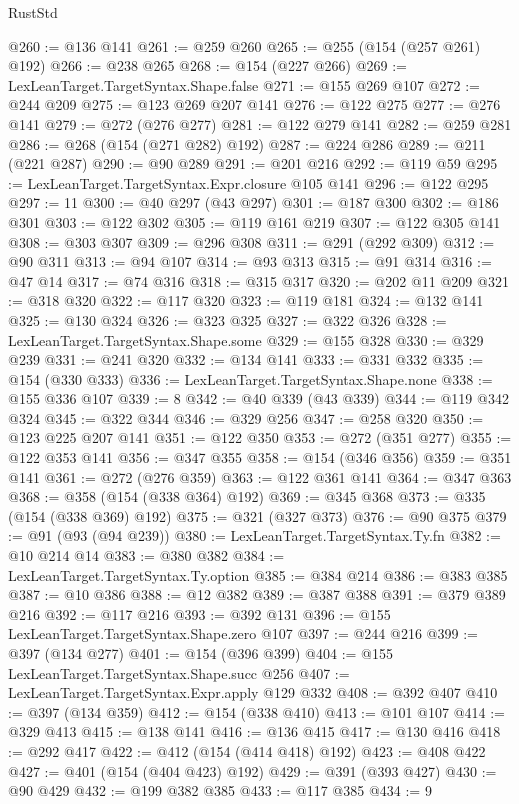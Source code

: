 \begin{lexlean}{RustStd}
\begin{coremodule}
@260 := @136 @141
@261 := @259 @260
@265 := @255 (@154 (@257 @261) @192)
@266 := @238 @265
@268 := @154 (@227 @266)
@269 := LexLeanTarget.TargetSyntax.Shape.false
@271 := @155 @269 @107
@272 := @244 @209
@275 := @123 @269 @207 @141
@276 := @122 @275
@277 := @276 @141
@279 := @272 (@276 @277)
@281 := @122 @279 @141
@282 := @259 @281
@286 := @268 (@154 (@271 @282) @192)
@287 := @224 @286
@289 := @211 (@221 @287)
@290 := @90 @289
@291 := @201 @216
@292 := @119 @59
@295 := LexLeanTarget.TargetSyntax.Expr.closure @105 @141
@296 := @122 @295
@297 := 11
@300 := @40 @297 (@43 @297)
@301 := @187 @300
@302 := @186 @301
@303 := @122 @302
@305 := @119 @161 @219
@307 := @122 @305 @141
@308 := @303 @307
@309 := @296 @308
@311 := @291 (@292 @309)
@312 := @90 @311
@313 := @94 @107
@314 := @93 @313
@315 := @91 @314
@316 := @47 @14
@317 := @74 @316
@318 := @315 @317
@320 := @202 @11 @209
@321 := @318 @320
@322 := @117 @320
@323 := @119 @181
@324 := @132 @141
@325 := @130 @324
@326 := @323 @325
@327 := @322 @326
@328 := LexLeanTarget.TargetSyntax.Shape.some
@329 := @155 @328
@330 := @329 @239
@331 := @241 @320
@332 := @134 @141
@333 := @331 @332
@335 := @154 (@330 @333)
@336 := LexLeanTarget.TargetSyntax.Shape.none
@338 := @155 @336 @107
@339 := 8
@342 := @40 @339 (@43 @339)
@344 := @119 @342 @324
@345 := @322 @344
@346 := @329 @256
@347 := @258 @320
@350 := @123 @225 @207 @141
@351 := @122 @350
@353 := @272 (@351 @277)
@355 := @122 @353 @141
@356 := @347 @355
@358 := @154 (@346 @356)
@359 := @351 @141
@361 := @272 (@276 @359)
@363 := @122 @361 @141
@364 := @347 @363
@368 := @358 (@154 (@338 @364) @192)
@369 := @345 @368
@373 := @335 (@154 (@338 @369) @192)
@375 := @321 (@327 @373)
@376 := @90 @375
@379 := @91 (@93 (@94 @239))
@380 := LexLeanTarget.TargetSyntax.Ty.fn
@382 := @10 @214 @14
@383 := @380 @382
@384 := LexLeanTarget.TargetSyntax.Ty.option
@385 := @384 @214
@386 := @383 @385
@387 := @10 @386
@388 := @12 @382
@389 := @387 @388
@391 := @379 @389 @216
@392 := @117 @216
@393 := @392 @131
@396 := @155 LexLeanTarget.TargetSyntax.Shape.zero @107
@397 := @244 @216
@399 := @397 (@134 @277)
@401 := @154 (@396 @399)
@404 := @155 LexLeanTarget.TargetSyntax.Shape.succ @256
@407 := LexLeanTarget.TargetSyntax.Expr.apply @129 @332
@408 := @392 @407
@410 := @397 (@134 @359)
@412 := @154 (@338 @410)
@413 := @101 @107
@414 := @329 @413
@415 := @138 @141
@416 := @136 @415
@417 := @130 @416
@418 := @292 @417
@422 := @412 (@154 (@414 @418) @192)
@423 := @408 @422
@427 := @401 (@154 (@404 @423) @192)
@429 := @391 (@393 @427)
@430 := @90 @429
@432 := @199 @382 @385
@433 := @117 @385
@434 := 9

\end{coremodule}
\end{lexlean}
